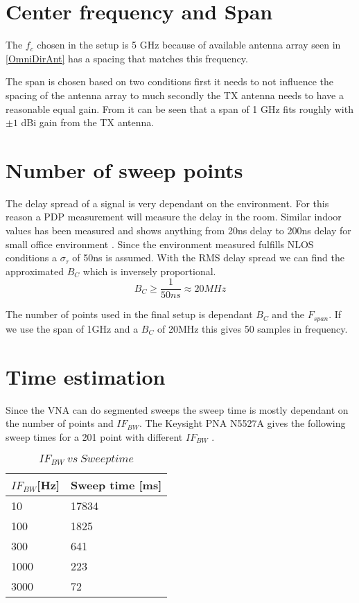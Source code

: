 \section{Center frequency and Span}
The $f_{c}$ chosen in the setup is 5 GHz  because of available antenna array seen in \autoref{OmniDirAnt} has a spacing that matches this frequency.

The span is chosen based on two conditions first it needs to not influence the spacing of the antenna array to much secondly the TX antenna needs to have a reasonable equal gain. From  it can be seen that a span of 1 GHz fits roughly with $\pm 1$ dBi gain from the TX antenna.


\section{Number of sweep points}
The delay spread of a signal is very dependant on the environment. For this reason a PDP measurement will measure the delay in the room. Similar indoor values has been measured and shows anything from 20ns delay to 200ns delay for small office environment \citep{indoor_delay}. Since the environment measured fulfills NLOS conditions a $\sigma_{\tau}$ of 50ns is assumed. With the RMS delay spread we can find the approximated $B_C$ which is inversely proportional. 
\begin{equation}
B_C \geq \frac{1}{50ns} \approx 20MHz
\label{CohBW1}
\end{equation}

The number of points used in the final setup is dependant $B_C$ and the $F_{span}$. If we use the span of 1GHz and a $B_C$ of 20MHz this gives 50 samples in frequency.

\section{Time estimation}
\label{TIME_EST}
Since the \gls{VNA} can do segmented sweeps the sweep time is mostly dependant on the number of points and $IF_{BW}$.
The Keysight PNA N5527A gives the following sweep times for a 201 point with different $IF_{BW}$ \citep{Key_PNA}. \\

\begin{table}[H]
\centering
\label{my-label}
\begin{tabular}{|l|l|}
\hline
$IF_{BW}${[}Hz{]} & Sweep time {[}ms{]} \\
\hline
10              & 17834               \\
100             & 1825                \\
300             & 641                 \\
1000            & 223                 \\
3000            & 72            \\
\hline 
\end{tabular}
\caption{$IF_{BW} \ vs \ Sweep time$}
\end{table}

